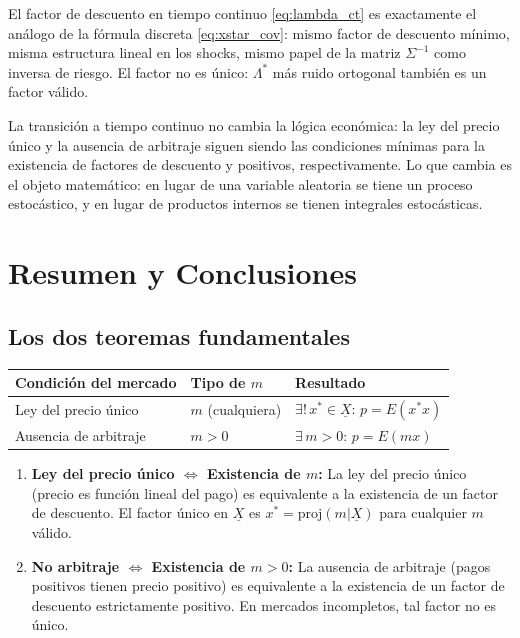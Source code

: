 \documentclass[12pt]{article}
\begin{document}
El factor de descuento en tiempo continuo \eqref{eq:lambda_ct} es exactamente el an\'alogo de la f\'ormula discreta \eqref{eq:xstar_cov}: mismo factor de descuento m\'inimo, misma estructura lineal en los shocks, mismo papel de la matriz $\Sigma^{-1}$ como inversa de riesgo. El factor no es \'unico: $\Lambda^*$ m\'as ruido ortogonal tambi\'en es un factor v\'alido.

\begin{intuicion}
La transici\'on a tiempo continuo no cambia la l\'ogica econ\'omica: la ley del precio \'unico y la ausencia de arbitraje siguen siendo las condiciones m\'inimas para la existencia de factores de descuento y positivos, respectivamente. Lo que cambia es el objeto matem\'atico: en lugar de una variable aleatoria se tiene un proceso estoc\'astico, y en lugar de productos internos se tienen integrales estoc\'asticas.
\end{intuicion}

\section{Resumen y Conclusiones}

\subsection{Los dos teoremas fundamentales}

\begin{center}
\begin{tabular}{lll}
\toprule
Condici\'on del mercado & Tipo de $m$ & Resultado \\
\midrule
Ley del precio \'unico & $m$ (cualquiera) & $\exists!\, x^* \in \underline{X}$: $p = E(x^*x)$ \\
Ausencia de arbitraje & $m > 0$ & $\exists\, m > 0$: $p = E(mx)$ \\
\bottomrule
\end{tabular}
\end{center}

\begin{enumerate}
    \item \textbf{Ley del precio \'unico $\iff$ Existencia de $m$:} La ley del precio \'unico (precio es funci\'on lineal del pago) es equivalente a la existencia de un factor de descuento. El factor \'unico en $\underline{X}$ es $x^* = \text{proj}(m|\underline{X})$ para cualquier $m$ v\'alido.

    \item \textbf{No arbitraje $\iff$ Existencia de $m > 0$:} La ausencia de arbitraje (pagos positivos tienen precio positivo) es equivalente a la existencia de un factor de descuento estrictamente positivo. En mercados incompletos, tal factor no es \'unico.
\end{enumerate}
\end{document}
